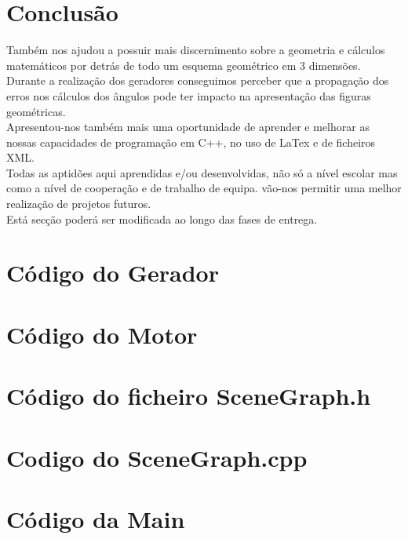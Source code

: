 \documentclass{article}
\begin{document}
\section{Conclusão}
Também nos ajudou a possuir mais discernimento sobre a geometria e cálculos matemáticos por detrás de todo um esquema geométrico em 3 dimensões.\\
Durante a realização dos geradores conseguimos perceber que a propagação dos erros nos cálculos dos ângulos pode ter impacto na apresentação das figuras geométricas.\\
Apresentou-nos também mais uma oportunidade de aprender e melhorar as nossas capacidades de programação em C++, no uso de LaTex e de ficheiros XML.\\
Todas as aptidões aqui aprendidas e/ou desenvolvidas, não só a nível escolar mas como a nível de cooperação e  de trabalho de equipa. vão-nos permitir uma melhor realização de projetos futuros.\\
Está secção poderá ser modificada ao longo das fases de entrega.\\

\newpage


\appendix

\section{Código do Gerador}



\newpage

\section{Código do Motor}



\newpage

\section{Código do ficheiro SceneGraph.h}



\newpage

\section{Codigo do SceneGraph.cpp}



\newpage 

\section{Código da Main}


\end{document}
